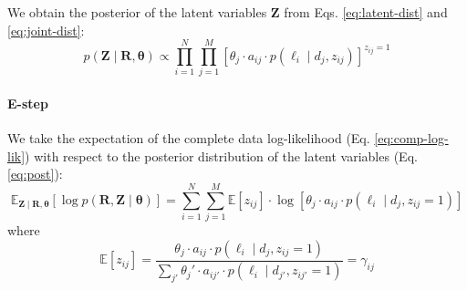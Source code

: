 We obtain the posterior of the latent variables $\bm{Z}$ from Eqs. \ref{eq:latent-dist} and \ref{eq:joint-dist}:
\begin{equation}
    p(\bm{Z}\mid\bm{R},\bm{\theta})\propto\prod_{i=1}^N\prod_{j=1}^M\left[\theta_j\cdot a_{ij}\cdot p(\ell_i\mid d_j,z_{ij})\right]^{z_{ij}=1}\label{eq:post}
\end{equation}
\paragraph{E-step} We take the expectation of the complete data log-likelihood (Eq. \ref{eq:comp-log-lik}) with respect to the posterior distribution of the latent variables (Eq. \ref{eq:post}):
\begin{equation}
    \mathbb{E}_{\bm{Z}\mid\bm{R},\bm{\theta}}\left[\log p(\bm{R},\bm{Z}\mid\bm{\theta})\right]=\sum_{i=1}^N\sum_{j=1}^M \mathbb{E}[z_{ij}]\cdot\log \left[\theta_j\cdot a_{ij}\cdot p(\ell_i\mid d_j, z_{ij}=1)\right]\label{eq:e-step}
\end{equation}
where 
\begin{equation}
    \mathbb{E}[z_{ij}]=\frac{\theta_j\cdot a_{ij}\cdot p(\ell_i\mid d_j, z_{ij}=1)}{\sum_{j'}\theta_j'\cdot a_{ij'}\cdot p(\ell_i\mid d_{j'}, z_{ij'}=1)}=\gamma_{ij}
\end{equation}

